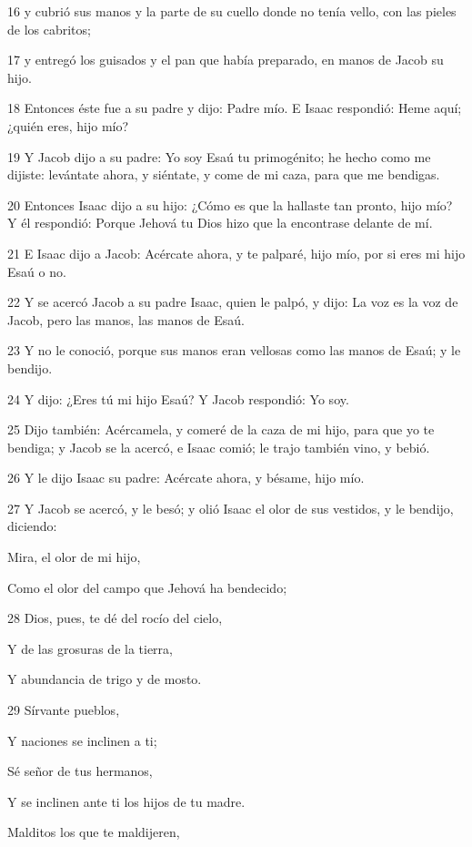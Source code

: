 \par 16 y cubrió sus manos y la parte de su cuello donde no tenía vello, con las pieles de los cabritos;
\par 17 y entregó los guisados y el pan que había preparado, en manos de Jacob su hijo.
\par 18 Entonces éste fue a su padre y dijo: Padre mío. E Isaac respondió: Heme aquí; ¿quién eres, hijo mío?
\par 19 Y Jacob dijo a su padre: Yo soy Esaú tu primogénito; he hecho como me dijiste: levántate ahora, y siéntate, y come de mi caza, para que me bendigas.
\par 20 Entonces Isaac dijo a su hijo: ¿Cómo es que la hallaste tan pronto, hijo mío? Y él respondió: Porque Jehová tu Dios hizo que la encontrase delante de mí.
\par 21 E Isaac dijo a Jacob: Acércate ahora, y te palparé, hijo mío, por si eres mi hijo Esaú o no.
\par 22 Y se acercó Jacob a su padre Isaac, quien le palpó, y dijo: La voz es la voz de Jacob, pero las manos, las manos de Esaú.
\par 23 Y no le conoció, porque sus manos eran vellosas como las manos de Esaú; y le bendijo.
\par 24 Y dijo: ¿Eres tú mi hijo Esaú? Y Jacob respondió: Yo soy.
\par 25 Dijo también: Acércamela, y comeré de la caza de mi hijo, para que yo te bendiga; y Jacob se la acercó, e Isaac comió; le trajo también vino, y bebió.
\par 26 Y le dijo Isaac su padre: Acércate ahora, y bésame, hijo mío.
\par 27 Y Jacob se acercó, y le besó; y olió Isaac el olor de sus vestidos, y le bendijo, diciendo:
\par Mira, el olor de mi hijo,
\par Como el olor del campo que Jehová ha bendecido;
\par 28 Dios, pues, te dé del rocío del cielo,
\par Y de las grosuras de la tierra,
\par Y abundancia de trigo y de mosto.
\par 29 Sírvante pueblos,
\par Y naciones se inclinen a ti;
\par Sé señor de tus hermanos,
\par Y se inclinen ante ti los hijos de tu madre.
\par Malditos los que te maldijeren,
